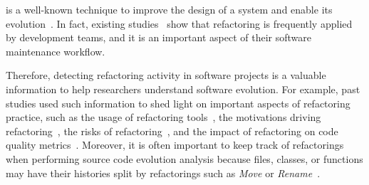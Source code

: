 \documentclass[10pt,journal,compsoc]{IEEEtran}
\begin{document}
\maketitle


\IEEEdisplaynontitleabstractindextext



%
\IEEEpeerreviewmaketitle








 is a well-known technique to improve the design of a system and enable its evolution~\cite{Fowler:1999}.
In fact, existing studies~\cite{MurphyHill2012, tsantalis_empiricalstudy, Kim:2012:FSE, kim-tse-2014, fse2016-why-we-refactor} show that refactoring is frequently applied by development teams, and it is an important aspect of their software maintenance workflow.

Therefore, detecting refactoring activity in software projects is a valuable information to help researchers understand software evolution.
For example, past studies used such information to shed light on important aspects of refactoring practice, such as the usage of refactoring tools~\cite{negara2013, MurphyHill2012}, the motivations driving refactoring~\cite{Kim:2012:FSE, kim-tse-2014, fse2016-why-we-refactor}, the risks of refactoring~\cite{Kim:2012:FSE, kim-tse-2014, Kim:2011, weissgerber2006refactorings, bavota2012does}, and the impact of refactoring on code quality metrics~\cite{Kim:2012:FSE, kim-tse-2014}.
Moreover, it is often important to keep track of refactorings when performing source code evolution analysis because files, classes, or functions may have their histories split by  refactorings such as \emph{Move} or \emph{Rename}~\cite{icse2018}.
\end{document}
